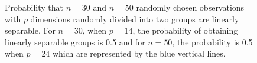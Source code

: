 \documentclass[12]{article}
\begin{document}
\begin{figure}[hbtp]
   \centering
       \caption{Probability that $n =30$ and $n = 50$ randomly chosen observations with $p$ dimensions randomly divided into two groups are linearly separable. For $n = 30$, when $p = 14$, the probability of obtaining linearly separable groups is 0.5 and for $n = 50$, the probability is 0.5 when $p = 24$ which are represented by the blue vertical lines. }
       \label{combin}
\end{figure}




\end{document}
